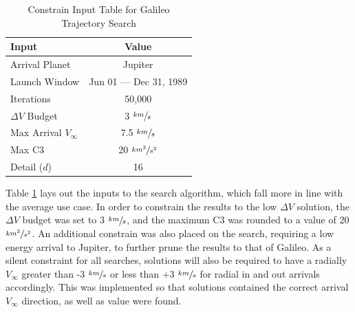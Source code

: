 \documentclass[letterpaper, preprint, paper,11pt]{AAS}	%
\begin{document}
\begin{table}[htb]
    \centering
    \caption{Constrain Input Table for Galileo Trajectory Search}
    \label{table:galiInputs}
    \begin{tabular}{lc}
        \toprule
        \textbf{Input} & \textbf{Value}\\
        \midrule
        Arrival Planet & Jupiter \\
        Launch Window & Jun 01 --- Dec 31, 1989 \\
        Iterations & 50,000 \\
        $\Delta V$ Budget & 3 $\sfrac{km}{s}$ \\
        Max Arrival $V_{\infty}$ & 7.5 $\sfrac{km}{s}$  \\
        Max C3 & 20 $\sfrac{km^2}{s^2}$ \\
        Detail ($d$) & 16 \\
        \bottomrule
    \end{tabular}
\end{table}

Table \ref*{table:galiInputs} lays out the inputs to the search algorithm, which fall more in line with the average use case. In order to constrain the results to the low $\Delta V$ solution, the $\Delta V$ budget was set to 3 $\sfrac{km}{s}$, and the maximum C3 was rounded to a value of 20 $\sfrac{km^2}{s^2}$. An additional constrain was also placed on the search, requiring a low energy arrival to Jupiter, to further prune the results to that of Galileo. As a silent constraint for all searches, solutions will also be required to have a radially $V_\infty$ greater than -3 $\sfrac{km}{s}$ or less than +3 $\sfrac{km}{s}$ for radial in and out arrivals accordingly. This was implemented so that solutions contained the correct arrival $V_\infty$ direction, as well as value were found.
\end{document}
